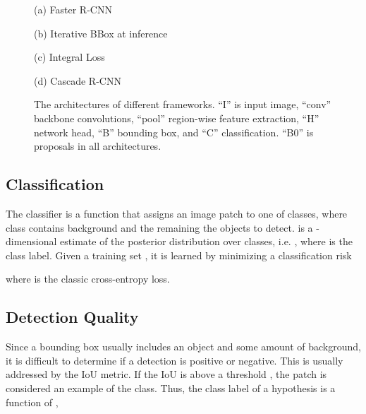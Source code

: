 \documentclass[10pt,twocolumn,letterpaper]{article}
\begin{document}
\begin{figure*}[!t]
\begin{minipage}[b]{.17\linewidth}
\centering
\centerline{}{(a) Faster R-CNN}
\end{minipage}
\hfill
\begin{minipage}[b]{.3\linewidth}
\centering
\centerline{}{(b) Iterative BBox at inference}
\end{minipage}
\hfill
\begin{minipage}[b]{.21\linewidth}
\centering
\centerline{}{(c) Integral Loss}
\end{minipage}
\hfill
\begin{minipage}[b]{.3\linewidth}
\centering
\centerline{}{(d) Cascade R-CNN}
\end{minipage}
\caption{The architectures of different frameworks. ``I'' is input image, ``conv'' backbone convolutions, ``pool'' region-wise feature extraction, ``H'' network head, ``B'' bounding box, and ``C'' classification. ``B0'' is proposals in all architectures.}
\label{fig:framework}
\end{figure*}

\subsection{Classification}
\label{subsec:classification}

The classifier is a function  that assigns an image patch  to one
of  classes, where class  contains background and the remaining
the objects to detect.  is a -dimensional estimate
of the posterior distribution over classes, i.e. ,
where  is the class label. Given a training set , it is
learned by minimizing a classification risk

where  is the classic cross-entropy loss.


\subsection{Detection Quality}

Since a bounding box usually includes an object and some amount of background, it is difficult to determine if a detection is positive or negative. This is usually addressed by the IoU metric. If the IoU is above a threshold , the patch is considered an example of the class. Thus, the class label of a hypothesis  is a function of ,
\end{document}

